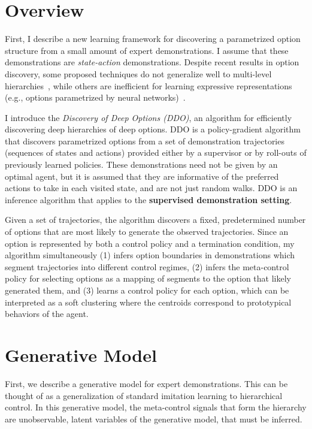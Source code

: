 \section{Overview}
\label{ddco}
First, I describe a new learning framework for discovering a parametrized option structure from a small amount of expert demonstrations.
I assume that these demonstrations are \emph{state-action} demonstrations.
Despite recent results in option discovery, some proposed techniques do not generalize well to multi-level hierarchies~\cite{kulkarni2016hierarchical, heess2016learning, baconHP16}, while others are inefficient for learning expressive representations (e.g., options parametrized by neural networks)~\cite{daniel2012hierarchical,lakshminarayananKKR16,hamidiTGF15,buiVW02}.

I introduce the \emph{Discovery of Deep Options (DDO)}, an algorithm for efficiently discovering deep hierarchies of deep options. DDO is a policy-gradient algorithm that discovers parametrized options from a set of demonstration trajectories (sequences of states and actions) provided either by a supervisor or by roll-outs of previously learned policies. These demonstrations need not be given by an optimal agent, but it is assumed that they are informative of the preferred actions to take in each visited state, and are not just random walks. DDO is an inference algorithm that applies to the \textbf{supervised demonstration setting}.

Given a set of trajectories, the algorithm discovers a fixed, predetermined number of options that are most likely to generate the observed trajectories. Since an option is represented by both a control policy and a termination condition, my algorithm simultaneously (1) infers option boundaries in demonstrations which segment trajectories into different control regimes, (2) infers the meta-control policy for selecting options as a mapping of segments to the option that likely generated them, and (3) learns a control policy for each option, which can be interpreted as a soft clustering where the centroids correspond to prototypical behaviors of the agent.

\section{Generative Model}
First, we describe a generative model for expert demonstrations.
This can be thought of as a generalization of standard imitation learning to hierarchical control. In this generative model, the meta-control signals that form the hierarchy are unobservable, latent variables of the generative model, that must be inferred.

